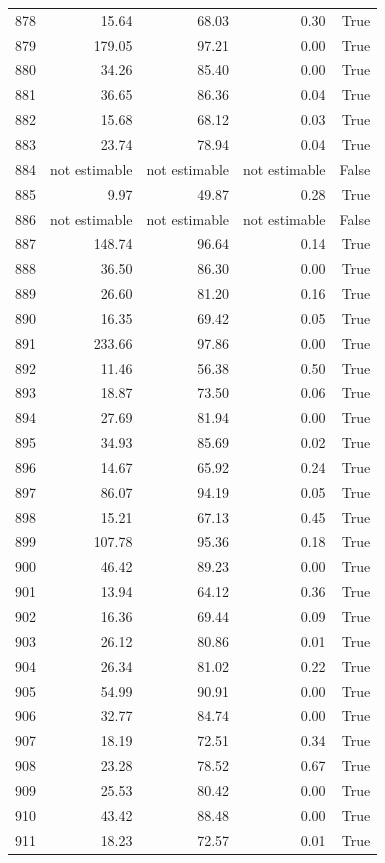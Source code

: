 \begin{longtable}{rrrrr}
878 & 15.64 & 68.03 & 0.30 & True \\
879 & 179.05 & 97.21 & 0.00 & True \\
880 & 34.26 & 85.40 & 0.00 & True \\
881 & 36.65 & 86.36 & 0.04 & True \\
882 & 15.68 & 68.12 & 0.03 & True \\
883 & 23.74 & 78.94 & 0.04 & True \\
884 & not estimable & not estimable & not estimable & False \\
885 & 9.97 & 49.87 & 0.28 & True \\
886 & not estimable & not estimable & not estimable & False \\
887 & 148.74 & 96.64 & 0.14 & True \\
888 & 36.50 & 86.30 & 0.00 & True \\
889 & 26.60 & 81.20 & 0.16 & True \\
890 & 16.35 & 69.42 & 0.05 & True \\
891 & 233.66 & 97.86 & 0.00 & True \\
892 & 11.46 & 56.38 & 0.50 & True \\
893 & 18.87 & 73.50 & 0.06 & True \\
894 & 27.69 & 81.94 & 0.00 & True \\
895 & 34.93 & 85.69 & 0.02 & True \\
896 & 14.67 & 65.92 & 0.24 & True \\
897 & 86.07 & 94.19 & 0.05 & True \\
898 & 15.21 & 67.13 & 0.45 & True \\
899 & 107.78 & 95.36 & 0.18 & True \\
900 & 46.42 & 89.23 & 0.00 & True \\
901 & 13.94 & 64.12 & 0.36 & True \\
902 & 16.36 & 69.44 & 0.09 & True \\
903 & 26.12 & 80.86 & 0.01 & True \\
904 & 26.34 & 81.02 & 0.22 & True \\
905 & 54.99 & 90.91 & 0.00 & True \\
906 & 32.77 & 84.74 & 0.00 & True \\
907 & 18.19 & 72.51 & 0.34 & True \\
908 & 23.28 & 78.52 & 0.67 & True \\
909 & 25.53 & 80.42 & 0.00 & True \\
910 & 43.42 & 88.48 & 0.00 & True \\
911 & 18.23 & 72.57 & 0.01 & True \\

\end{longtable}
